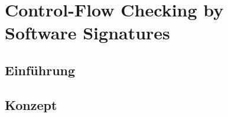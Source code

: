 \documentclass[10pt,twocolumn]{article}
\begin{document}


\section{Control-Flow Checking by\\Software Signatures}

\subsection{Einführung}


\subsection{Konzept}



\end{document}
